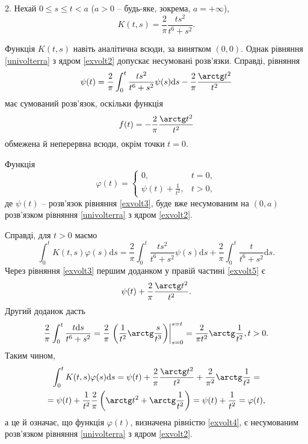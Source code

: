 \documentclass[14pt,twoside]{extreport}
\theoremstyle{mystyle}
\numberwithin{equation}{chapter}
\begin{document}
2. Нехай $0 \leqslant s \leqslant t < a$ ($a > 0$ -- будь-яке, зокрема, $a = +\infty$),
\begin{equation}\label{exvolt2}
K(t, s) = \frac{2}{\pi} \frac{ts^2}{t^6 + s^2}.
\end{equation}

Функція $K(t, s)$ навіть аналітична всюди, за винятком $(0, 0)$. Однак рівняння \eqref{univolterra} з ядром \eqref{exvolt2} допускає несумовані розв'язки. Справді, рівняння
\begin{equation}\label{exvolt3}
\psi(t) = \frac{2}{\pi}\int_{0}^{t} \frac{ts^2}{t^6 + s^2} \psi(s) \mathrm{d}s - \frac{2}{\pi} \frac{\arctg t^2}{t^2}
\end{equation}
має сумований розв'язок, оскільки функція
\[
f(t) = -\frac{2}{\pi}\frac{\arctg t^2}{t^2}
\]
обмежена й неперервна всюди, окрім точки $t = 0$.

Функція
\begin{equation}\label{exvolt4}
\varphi(t) = \left\{
\begin{array}{ll}
0, & t=0,\\
\psi(t) + \frac{1}{t^2}, & t>0,
\end{array}
\right.
\end{equation}
де $\psi(t)$ -- розв'язок рівняння \eqref{exvolt3}, буде вже несумованим на $(0, a)$ розв'язком рівняння \eqref{univolterra} з ядром \eqref{exvolt2}.

Справді, для $t>0$ маємо
\begin{equation}\label{exvolt5}
\int_{0}^{t} K (t, s) \varphi(s) \mathrm{d}s = \frac{2}{\pi} \int_{0}^{t} \frac{ts^2}{t^6 + s^2} \psi(s) \mathrm{d}s + \frac{2}{\pi} \int_{0}^{t} \frac{t}{t^6 + s^2} \mathrm{d}s.
\end{equation}
Через рівняння \eqref{exvolt3} першим доданком у правій частині \eqref{exvolt5} є
\[
\psi(t) + \frac{2}{\pi} \frac{\arctg t^2}{t^2}.
\]
Другий доданок дасть
\[
\frac{2}{\pi} \int_{0}^{t} \frac{t\mathrm{d}s}{t^6+s^2} = \frac{2}{\pi} \left.\left(\frac{1}{t^2}\arctg \frac{s}{t^3}\right)\right|_{s=0}^{s=t} = \frac{2}{\pi t^2} \arctg \frac{1}{t^2}, t>0.
\]
Таким чином,
\begin{multline*}
\int_{0}^{t} K(t, s) \varphi(s) \mathrm{d}s = \psi(t) + \frac{2}{\pi} \frac{\arctg t^2}{t^2} + \frac{2}{\pi ^2} \arctg \frac{1}{t^2}=\\
= \psi(t) + \frac{1}{t^2} \frac{2}{\pi} \left(\arctg t^2 + \arctg \frac{1}{t^2}\right) = \psi(t) + \frac{1}{t^2} = \varphi(t),
\end{multline*}
а це й означає, що функція $\varphi(t)$, визначена рівністю \eqref{exvolt4}, є несумованим розв'язком рівняння \eqref{univolterra} з ядром \eqref{exvolt2}.
\end{document}
